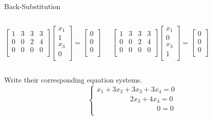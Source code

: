 \documentclass{beamer}
\begin{document}
\begin{frame}{Back-Substitution}
\begin{columns}
    \begin{equation*}
        \left[ \begin{matrix}
            1&		3&		3&		3\\
            0&		0&		2&		4\\
            0&		0&		0&		0\\
        \end{matrix} \right] \left[ \begin{array}{c}
            x_1\\
            1\\
            x_3\\
            0\\
        \end{array} \right] =\left[ \begin{array}{c}
            0\\
            0\\
            0\\
        \end{array} \right]
    \end{equation*}

    \begin{equation*}
        \left[ \begin{matrix}
            1&		3&		3&		3\\
            0&		0&		2&		4\\
            0&		0&		0&		0\\
        \end{matrix} \right] \left[ \begin{array}{c}
            x_1\\
            0\\
            x_3\\
            1\\
        \end{array} \right] =\left[ \begin{array}{c}
            0\\
            0\\
            0\\
        \end{array} \right]
    \end{equation*}
\end{columns}

\vspace{5pt}
Write their corresponding equation systems.
\begin{equation*}
    \begin{cases}
        x_1+3x_2+3x_3+3x_4=0\\
        \qquad\qquad\ \ \:           2x_3+4x_4=0\\
        \qquad\qquad\qquad\qquad\:\:                     0=0\\
    \end{cases}
\end{equation*}


\end{frame}
\end{document}
